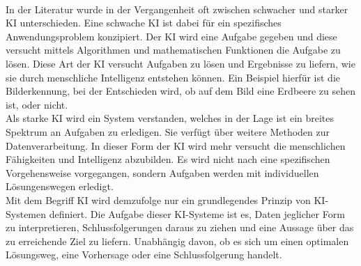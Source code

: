 \begin{onehalfspace}
        \\
        In der Literatur wurde in der Vergangenheit oft zwischen \glqq{}schwacher\grqq{} und \glqq{}starker\grqq{} \ac{KI} unterschieden. Eine schwache \ac{KI} ist dabei für ein spezifisches Anwendungsproblem konzipiert. Der \ac{KI} wird eine Aufgabe gegeben und diese versucht mittels Algorithmen und mathematischen Funktionen die Aufgabe zu lösen. Diese Art der \ac{KI} versucht Aufgaben zu lösen und Ergebnisse zu liefern, wie sie durch menschliche Intelligenz entstehen können.\cite{Lis2019} Ein Beispiel hierfür ist die Bilderkennung, bei der Entschieden wird, ob auf dem Bild eine Erdbeere zu sehen ist, oder nicht.
        \\
        Als starke \ac{KI} wird ein System verstanden, welches in der Lage ist ein breites Spektrum an Aufgaben zu erledigen.\cite{Datenkommission2019} Sie verfügt über weitere Methoden zur Datenverarbeitung. In dieser Form der \ac{KI} wird mehr versucht die menschlichen Fähigkeiten und Intelligenz abzubilden. Es wird nicht nach eine spezifischen Vorgehensweise vorgegangen, sondern Aufgaben werden mit individuellen Lösungenswegen erledigt.\cite{Lis2019}
        \\
        Mit dem Begriff \ac{KI} wird demzufolge nur ein grundlegendes Prinzip von \ac*{KI}-Systemen definiert. Die Aufgabe dieser \ac*{KI}-Systeme ist es, Daten jeglicher Form zu interpretieren, Schlussfolgerungen daraus zu ziehen und eine Aussage über das zu erreichende Ziel zu liefern. Unabhängig davon, ob es sich um einen optimalen Lösungsweg, eine Vorhersage oder eine Schlussfolgerung handelt.\cite{HEGKI2019Definition}    
    

\end{onehalfspace}
